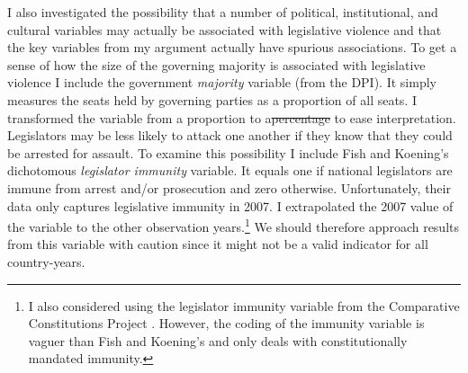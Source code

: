 \documentclass[a4paper]{article}\usepackage[]{graphicx}\usepackage[]{color}
\providecommand{\DIFaddtex}[1]{{\protect\color{blue}\uwave{#1}}} %
\providecommand{\DIFdeltex}[1]{{\protect\color{red}\sout{#1}}}                      %
\providecommand{\DIFaddbegin}{} %
\providecommand{\DIFaddend}{} %
\providecommand{\DIFdelbegin}{} %
\providecommand{\DIFdelend}{} %
\providecommand{\DIFadd}[1]{\texorpdfstring{\DIFaddtex{#1}}{#1}} %
\providecommand{\DIFdel}[1]{\texorpdfstring{\DIFdeltex{#1}}{}} %
\begin{document}
I also investigated the possibility that a number of political, institutional, and cultural variables may actually be associated with legislative violence and that the key variables from my argument actually have spurious associations. To get a sense of how the size of the governing majority is associated with legislative violence I include the government {\emph{majority}} variable (from the DPI). It simply measures the seats held by governing parties as a proportion of all seats. I transformed the variable from a proportion to a\DIFdelbegin \DIFdel{percentage }\DIFdelend \DIFaddbegin \DIFadd{\%age }\DIFaddend to ease interpretation. Legislators may be less likely to attack one another if they know that they could be arrested for assault. To examine this possibility I include Fish and Koening's \citeyearpar{Fish2009} dichotomous \emph{legislator immunity} variable. It equals one if national legislators are immune from arrest and/or prosecution and zero otherwise. Unfortunately, their data only captures legislative immunity in 2007. I extrapolated the 2007 value of the variable to the other observation years.\footnote{I also considered using the legislator immunity variable from the Comparative Constitutions Project \citep{ElkinsCCP2010}. However, the coding of the immunity variable is vaguer than Fish and Koening's and only deals with constitutionally mandated immunity.} We should therefore approach results from this variable with caution since it might not be a valid indicator for all country-years.
\end{document}
